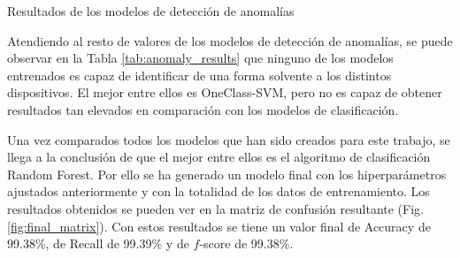 \begin{table}
    \centering
    
    \caption{Resultados de los modelos de detección de anomalías}
    \label{tab:anomaly_results}
\end{table}

Atendiendo al resto de valores de los modelos de detección de anomalías, se puede observar en la Tabla \ref{tab:anomaly_results} que ninguno de los modelos entrenados es capaz de identificar de una forma solvente a los distintos dispositivos. El mejor entre ellos es OneClass-SVM, pero no es capaz de obtener resultados tan elevados en comparación con los modelos de clasificación.

Una vez comparados todos los modelos que han sido creados para este trabajo, se llega a la conclusión de que el mejor entre ellos es el algoritmo de clasificación Random Forest. Por ello se ha generado un modelo final con los hiperparámetros ajustados anteriormente y con la totalidad de los datos de entrenamiento. Los resultados obtenidos se pueden ver en la matriz de confusión resultante (Fig. \ref{fig:final_matrix}). Con estos resultados se tiene un valor final de Accuracy de 99.38\%, de Recall de 99.39\% y de $f$-score de 99.38\%.

